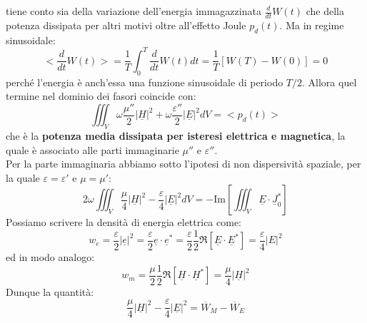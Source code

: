 \documentclass{book}
\begin{document}
        tiene conto sia della variazione dell'energia immagazzinata $\frac{d}{dt}W(t)$ che della potenza dissipata per altri motivi
        oltre all'effetto Joule $p_{d}(t)$. Ma in regime sinusoidale:
        \begin{equation}
            <\frac{d}{dt}W(t)> = \frac{1}{T} \int_{0} ^{T} \frac{d}{dt}W(t)dt = \frac{1}{T}[W(T)-W(0)] = 0
        \end{equation}
        perché l'energia è anch'essa una funzione sinusoidale di periodo $T/2$. Allora quel termine nel dominio dei fasori coincide con:
        \begin{equation}
            \iiint_{V} \omega \frac{\mu ''}{2} |\underline{H}|^{2}+\omega \frac{\varepsilon ''}{2}|\underline{E}|^{2}dV = <p_{d}(t)>
        \end{equation}
        che è la \textbf{potenza media dissipata per isteresi elettrica e magnetica}, la quale è associato alle parti immaginarie 
        $\mu ''$ e $\varepsilon ''$. \\
        Per la parte immaginaria abbiamo sotto l'ipotesi di non dispersività spaziale, per la quale $\varepsilon=\varepsilon'$ e $\mu = \mu'$:
        \begin{equation}
            \label{eqn:parte_img_poynting}
            2 \omega \iiint_{V} \frac{\mu}{4}|\underline{H}|^{2}-\frac{\varepsilon}{4}|\underline{E}|^{2}dV = -\text{Im}[\iiint_{V} \underline{E} \cdot \underline{J}_{0} ^{*}]
        \end{equation}
        Possiamo scrivere la densità di energia elettrica come:
        \begin{equation}
                \displaystyle w_{e} = \frac{\varepsilon}{2}|\underline{e}|^{2} = \frac{\varepsilon}{2}\underline{e} \cdot \underline{e}^{*}
                 = \frac{\varepsilon}{2} \frac{1}{2}\Re[\underline{E}\cdot\underline{E}^{*}] = \frac{\varepsilon}{4}|E|^{2}
        \end{equation}
        ed in modo analogo:
        \begin{equation}
            w_{m} = \frac{\mu}{2}\frac{1}{2}\Re[\underline{H} \cdot \underline{H}^{*}] = \frac{\mu}{4}|\underline{H}|^{2}
        \end{equation}
        Dunque la quantità:
        \begin{equation}
            \label{eqn:diff_media_magnetica_elettrica}
            \frac{\mu}{4}|\underline{H}|^{2}-\frac{\varepsilon}{4}|\underline{E}|^{2} = \overline{W}_{M}-\overline{W}_{E}
        \end{equation}
\end{document}
